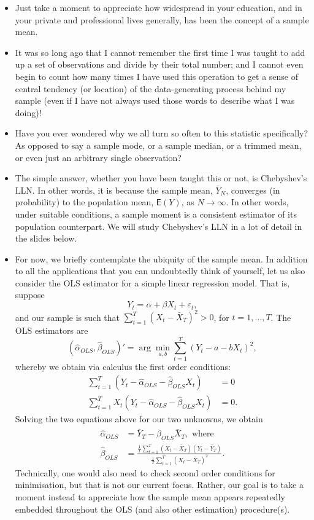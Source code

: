 \documentclass[
  letterpaper,
  DIV=11,
  numbers=noendperiod]{scrartcl}
\begin{document}
\begin{itemize}
\item
  Just take a moment to appreciate how widespread in your education, and
  in your private and professional lives generally, has been the concept
  of a sample mean.
\item
  It was so long ago that I cannot remember the first time I was taught
  to add up a set of observations and divide by their total number; and
  I cannot even begin to count how many times I have used this operation
  to get a sense of central tendency (or location) of the
  data-generating process behind my sample (even if I have not always
  used those words to describe what I was doing)!
\item
  Have you ever wondered why we all turn so often to this statistic
  specifically? As opposed to say a sample mode, or a sample median, or
  a trimmed mean, or even just an arbitrary single observation?
\item
  The simple answer, whether you have been taught this or not, is
  Chebyshev's LLN. In other words, it is because the sample mean,
  \(\bar{Y}_N\), converges (in probability) to the population mean,
  \(\mathsf{E}(Y)\), as \(N \to \infty\). In other words, under suitable
  conditions, a sample moment is a consistent estimator of its
  population counterpart. We will study Chebyshev's LLN in a lot of
  detail in the slides below.
\item
  For now, we briefly contemplate the ubiquity of the sample mean. In
  addition to all the applications that you can undoubtedly think of
  yourself, let us also consider the OLS estimator for a simple linear
  regression model. That is, suppose
  \[Y_t = \alpha + \beta X_t + \varepsilon_t,\] and our sample is such
  that \(\sum_{t=1}^{T} (X_t - \bar{X}_T)^2 > 0\), for
  \(t = 1,\ldots,T\). The OLS estimators are
  \[(\hat{\alpha}_{\scriptscriptstyle OLS}, \hat{\beta}_{\scriptscriptstyle OLS})' = \arg\min_{a,b} \sum_{t=1}^{T}\left(Y_t - a - bX_t\right)^2,\]
  whereby we obtain via calculus the first order conditions:
  \[\begin{aligned} \sum_{t=1}^{T}(Y_t - \hat{\alpha}_{\scriptscriptstyle OLS} - \hat{\beta}_{\scriptscriptstyle OLS}X_t) &= 0 \\ \sum_{t=1}^{T} X_t(Y_t - \hat{\alpha}_{\scriptscriptstyle OLS} - \hat{\beta}_{\scriptscriptstyle OLS}X_t) &= 0. \end{aligned}\]
  Solving the two equations above for our two unknowns, we obtain
  \[\begin{aligned} \hat{\alpha}_{\scriptscriptstyle OLS} &= \bar{Y}_T - \hat{\beta}_{\scriptscriptstyle OLS}\bar{X}_T, \text{ where} \\ \hat{\beta}_{\scriptscriptstyle OLS} &= \frac{\frac{1}{T}\sum_{t=1}^{T}(X_t - \bar{X}_T)(Y_t - \bar{Y}_T)}{\frac{1}{T}\sum_{t=1}^{T}(X_t - \bar{X}_T)^2}. \end{aligned}\]
  Technically, one would also need to check second order conditions for
  minimisation, but that is not our current focus. Rather, our goal is
  to take a moment instead to appreciate how the sample mean appears
  repeatedly embedded throughout the OLS (and also other estimation)
  procedure(s).
\end{itemize}
\end{document}
